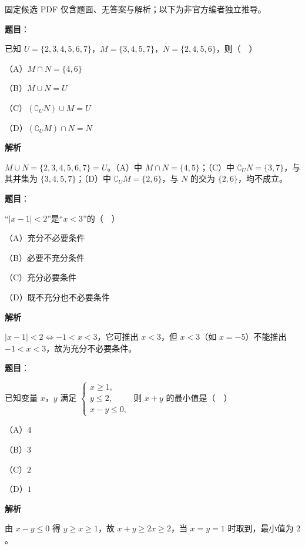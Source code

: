 

\begin{gktip}
固定候选 PDF 仅含题面、无答案与解析；以下为非官方编者独立推导。
\end{gktip}

\begin{answer}

\textbf{题目}：

已知 $U=\{2,3,4,5,6,7\}$，$M=\{3,4,5,7\}$，$N=\{2,4,5,6\}$，则（　）

（A）$M\cap N=\{4,6\}$

（B）$M\cup N=U$

（C）$(\complement_UN)\cup M=U$

（D）$(\complement_UM)\cap N=N$

\textbf{解析}

$M\cup N=\{2,3,4,5,6,7\}=U$。（A）中 $M\cap N=\{4,5\}$；（C）中 $\complement_UN=\{3,7\}$，与其并集为 $\{3,4,5,7\}$；（D）中 $\complement_UM=\{2,6\}$，与 $N$ 的交为 $\{2,6\}$，均不成立。


\end{answer}
\begin{answer}

\textbf{题目}：

“$|x-1|<2$”是“$x<3$”的（　）

（A）充分不必要条件

（B）必要不充分条件

（C）充分必要条件

（D）既不充分也不必要条件

\textbf{解析}

$|x-1|<2\iff-1<x<3$，它可推出 $x<3$，但 $x<3$（如 $x=-5$）不能推出 $-1<x<3$，故为充分不必要条件。


\end{answer}
\begin{answer}

\textbf{题目}：

已知变量 $x$，$y$ 满足 $\begin{cases}x\geqslant1,\\ y\leqslant2,\\ x-y\leqslant0,\end{cases}$ 则 $x+y$ 的最小值是（　）

（A）$4$

（B）$3$

（C）$2$

（D）$1$

\textbf{解析}

由 $x-y\leqslant0$ 得 $y\geqslant x\geqslant1$，故 $x+y\geqslant2x\geqslant2$，当 $x=y=1$ 时取到，最小值为 $2$。


\end{answer}
